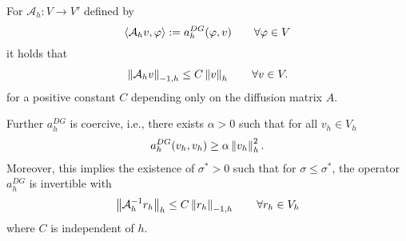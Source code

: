 \begin{theorem}[Stability]\label{thm: SIPG stability}
	For $\mathcal A_h:V \rightarrow V'$ defined by 
	\[
	 \langle \mathcal A_h v, \varphi \rangle := a_h^{DG}(\varphi, v) \qquad \forall \varphi \in V
	\]
	it holds that  
	\begin{align*}
	\HMinusOneDnorm{\mathcal A_h v} \leq C \eNorm v \qquad \forall v \in V. %
	\end{align*}
	for a positive constant $C$ depending only on the diffusion matrix $A$. 
	
	Further $a^{DG}_h$ is coercive, i.e., there exists $\alpha > 0 $ such that for all $v_h \in V_h$
	\begin{align}
		a_h^{DG}(v_h, v_h) \geq \alpha \left\lVert v_h \right\rVert_{h}^2. \label{eq: coercivity DG form}
	\end{align}	
	Moreover, this implies the existence of $\sigma^* > 0$ such that for $\sigma \leq \sigma^* $, the operator $a^{DG}_h$ is invertible with 
	\begin{align*}
	\eNorm {\mathcal A_h^{-1} {r_h}} \leq C \HMinusOneDnorm {r_h} \qquad \forall r_h \in V_h %
	\end{align*}
	where $C$ is independent of $h$. 
\end{theorem}
